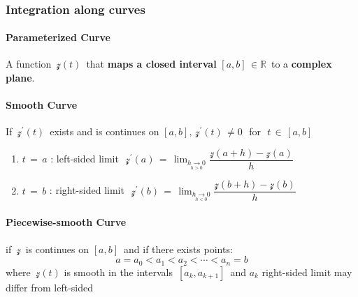 \documentclass[11pt]{article}
\newcommand{\prompt}[4]{
        {\ttfamily\llap{{\color{#2}[#3]:\hspace{3pt}#4}}\vspace{-\baselineskip}}
    }
\begin{document}
            
\prompt{Out}{outcolor}{55}{}
    
    \begin{center}
    \end{center}
    { \hspace*{\fill} \\}
    

    \subsubsection{Integration along curves}\label{integration-along-curves}

    \paragraph{Parameterized Curve}\label{parameterized-curve}

A function \(\,\mathcal{z}(t)\,\) that \textbf{maps a closed interval}
\(\left[a,b\right]\,\in \mathbb{R}\,\) to a \textbf{complex plane}.

\paragraph{Smooth Curve}\label{smooth-curve}

If \(\,\mathcal{z^{'}}(t)\,\) exists and is continues on
\(\left[a,b\right],\,\mathcal{z^{'}}(t)\,\ne 0\,\,\) for
\(\,\,t\,\in\,\left[a,b\right]\,\)

\begin{enumerate}
\def\labelenumi{\arabic{enumi})}
\item
  \(t\,=\,a\) : left-sided limit
  \(\,\,\mathcal{z^{'}}(a)\,=\,\lim_{\underset{h>0}{h\to 0}}{\dfrac{\mathcal{z}(a+h)-\mathcal{z}(a)}{h}}\,\,\)
\item
  \(t\,=\,b\) : right-sided limit
  \(\,\,\mathcal{z^{'}}(b)\,=\,\lim_{\underset{h<0}{h\to 0}}{\dfrac{\mathcal{z}(b+h)-\mathcal{z}(b)}{h}}\,\,\)
\end{enumerate}

\paragraph{Piecewise-smooth Curve}\label{piecewise-smooth-curve}

if \(\,\mathcal{z}\,\) is continues on \(\left[a,b\right]\,\) and if
there exists points:\[a=a_{0}<a_{1}<a_{2}<\cdots<a_{n}=b\] where
\(\,\mathcal{z}(t)\) is smooth in the intervals
\(\,\left[a_{k},a_{k+1}\right]\,\) and \(a_{k}\) right-sided limit may
differ from left-sided
\end{document}
